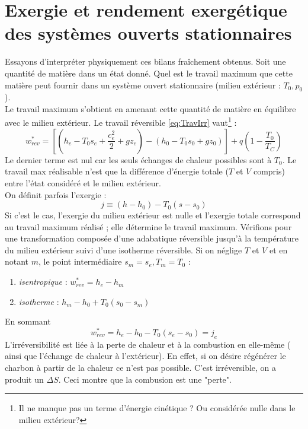		
	\newpage
	\section{Exergie et rendement exergétique des systèmes ouverts stationnaires}
	Essayons d’interpréter physiquement ces bilans fraîchement obtenus. Soit une 
	quantité de matière dans un état donné. Quel est le travail maximum que cette 
	matière peut fournir dans un système ouvert stationnaire (milieu extérieur : 
	$T_0,p_0$).\\
	Le travail maximum s'obtient en amenant cette quantité de matière en équilibre 
	avec le milieu extérieur. Le travail réversible \autoref{eq:TravIrr} vaut\footnote{
	Il ne manque pas un terme d'énergie cinétique ? Ou considérée nulle dans le milieu extérieur?} :
	\begin{equation}
	w_{rev}^* = \left[\left(h_e-T_0s_e+\dfrac{c_e^2}{2}+gz_e\right) - \left(h_0-T_0s_0
	+gz_0\right)\right] + q\left(1-\dfrac{T_0}{T_C}\right)
	\end{equation}
	Le dernier terme est nul car les seuls échanges de chaleur possibles sont à $T_0$. 
	Le travail max réalisable n'est que la différence d'énergie totale ($T$ et $V$ compris) 
	entre l'état considéré et le milieu extérieur.\\
	On définit parfois l'exergie :
	\begin{equation}
	j \equiv (h-h_0) - T_0(s-s_0)
	\end{equation}
	Si c'est le cas, l'exergie du milieu extérieur est nulle et l'exergie totale 
	correspond au travail maximum réalisé ; elle détermine le travail maximum. Vérifions 
	pour une transformation composée d'une adabatique réversible jusqu'à la température 
	du milieu extérieur suivi d'une isotherme réversible. Si on néglige $T$ et $V$ et 
	en notant $m$, le point intermédiaire $s_m=s_e, T_m=T_0$ :
	\begin{enumerate}
	\item \textit{isentropique} : $w_{rev}^* = h_e-h_m$
 	\item \textit{isotherme} : $h_m-h_0 + T_0(s_0-s_m)$
	\end{enumerate}
	En sommant
	\begin{equation}
	w_{rev}^* = h_e-h_0 - T_0(s_e-s_0) = j_e
	\end{equation}
	L'irréversibilité est liée à la perte de chaleur et à la combustion en elle-même (%
	ainsi que l'échange de chaleur à l'extérieur). En effet, si on désire régénérer 
	le charbon à partir de la chaleur ce n'est pas possible. C'est irréversible, on a 
	produit un $\Delta S$. Ceci montre que la combusion est une "perte".\\
	
